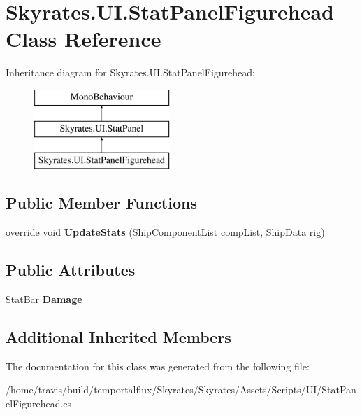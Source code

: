 \hypertarget{class_skyrates_1_1_u_i_1_1_stat_panel_figurehead}{\section{Skyrates.\-U\-I.\-Stat\-Panel\-Figurehead Class Reference}
\label{class_skyrates_1_1_u_i_1_1_stat_panel_figurehead}
}
Inheritance diagram for Skyrates.\-U\-I.\-Stat\-Panel\-Figurehead\-:\begin{figure}[H]
\begin{center}
\leavevmode
\includegraphics[height=3.000000cm]{class_skyrates_1_1_u_i_1_1_stat_panel_figurehead}
\end{center}
\end{figure}
\subsection*{Public Member Functions}
\begin{DoxyCompactItemize}
\item 
\hypertarget{class_skyrates_1_1_u_i_1_1_stat_panel_figurehead_a68a4801c2ef71463bcb32df144de353e}{override void {\bfseries Update\-Stats} (\hyperlink{class_skyrates_1_1_ship_1_1_ship_component_list}{Ship\-Component\-List} comp\-List, \hyperlink{class_skyrates_1_1_ship_1_1_ship_data}{Ship\-Data} rig)}\label{class_skyrates_1_1_u_i_1_1_stat_panel_figurehead_a68a4801c2ef71463bcb32df144de353e}

\end{DoxyCompactItemize}
\subsection*{Public Attributes}
\begin{DoxyCompactItemize}
\item 
\hypertarget{class_skyrates_1_1_u_i_1_1_stat_panel_figurehead_abd2d7db57072f22f38f8531e7913c004}{\hyperlink{class_skyrates_1_1_u_i_1_1_stat_bar}{Stat\-Bar} {\bfseries Damage}}\label{class_skyrates_1_1_u_i_1_1_stat_panel_figurehead_abd2d7db57072f22f38f8531e7913c004}

\end{DoxyCompactItemize}
\subsection*{Additional Inherited Members}


The documentation for this class was generated from the following file\-:\begin{DoxyCompactItemize}
\item 
/home/travis/build/temportalflux/\-Skyrates/\-Skyrates/\-Assets/\-Scripts/\-U\-I/Stat\-Panel\-Figurehead.\-cs\end{DoxyCompactItemize}
